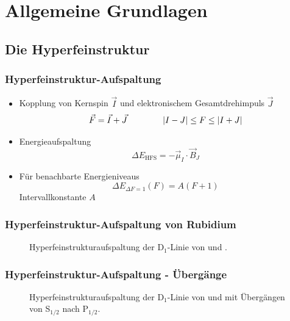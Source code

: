 
\section{Allgemeine Grundlagen}

\subsection{Die Hyperfeinstruktur}

\begin{frame}
\frametitle{Hyperfeinstruktur-Aufspaltung}
\begin{itemize}
    \item<1-> Kopplung von Kernspin $\vec{I}$ und elektronischem Gesamtdrehimpuls $\vec{J}$
    \begin{equation*}
        \vec{F} = \vec{I} + \vec{J} \qquad \qquad \left|I - J\right| \leq F \leq \left|I + J\right|
    \end{equation*}
    \item<2-> Energieaufspaltung
    \begin{equation*}
        \Delta E_\text{HFS} = - \vec{\mu}_I \cdot \vec{B}_J
    \end{equation*}
    \item<3-> Für benachbarte Energieniveaus
    \begin{equation*}
        \Delta E_{\Delta F = 1} (F) = A(F+1)
    \end{equation*}
    Intervallkonstante $A$
\end{itemize}
\end{frame}


\begin{frame}
\frametitle{Hyperfeinstruktur-Aufspaltung von Rubidium}

\begin{figure}
    \centering
    \def\svgwidth{\textwidth}
    
    \caption{Hyperfeinstrukturaufspaltung der D$_1$-Linie von  und .}
\end{figure}
\end{frame}


\begin{frame}
\frametitle{Hyperfeinstruktur-Aufspaltung - Übergänge}

\begin{figure}
    \centering
    \def\svgwidth{\textwidth}
    
    \caption{Hyperfeinstrukturaufspaltung der D$_1$-Linie von 
     und  mit Übergängen von S$_{1/2}$ nach P$_{1/2}.$}
\end{figure}
\end{frame}

